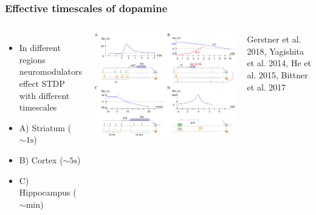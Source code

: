 \documentclass{beamer}
\begin{document}
\begin{frame}
\frametitle{Effective timescales of dopamine}
    \begin{columns}[T]
    

    \begin{itemize}
        \item In different regions neuromodulators effect STDP with different timescales
        \item A) Striatum ($\sim 1\text{s}$) 
        \item B) Cortex ($\sim 5\text{s}$) 
        \item C) Hippocampus ($\sim \text{min}$) 
    \end{itemize}

    \includegraphics[width=1.0\textwidth]{./figures/dopa_timeconst}

    \tiny{Gerstner et al. 2018, Yagishita et al. 2014, He et al. 2015, Bittner et al. 2017 }

  \end{columns}

\end{frame}
\end{document}
